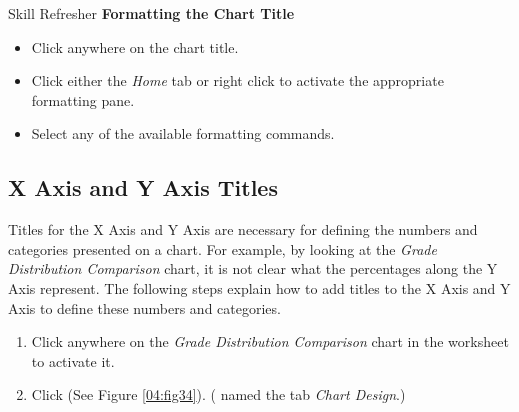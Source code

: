\begin{center}
	\begin{sklbox}{Skill Refresher}
		\textbf{Formatting the Chart Title}
		\\
		\begin{itemize}
			\setlength{\itemsep}{0pt}
			\setlength{\parskip}{0pt}
			\setlength{\parsep}{0pt}

			\item Click anywhere on the chart title.
			\item Click either the \textit{Home} tab or right click to activate the appropriate formatting pane.
			\item Select any of the available formatting commands.
			
		\end{itemize}
	\end{sklbox}
\end{center}

\subsection{X Axis and Y Axis Titles}

Titles for the X Axis and Y Axis are necessary for defining the numbers and categories presented on a chart. For example, by looking at the \textit{Grade Distribution Comparison} chart, it is not clear what the percentages along the Y Axis represent. The following steps explain how to add titles to the X Axis and Y Axis to define these numbers and categories.

\begin{enumerate}
	\item Click anywhere on the \textit{Grade Distribution Comparison} chart in the  worksheet to activate it.
	\item Click  (See Figure \ref{04:fig34}). ( named the tab \textit{Chart Design}.)
\end{enumerate}

